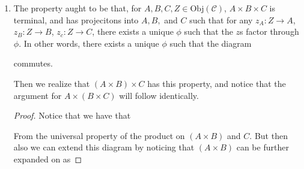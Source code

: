 \documentclass[12pt, twosided]{article}
\begin{document}
\begin{enumerate}
\begin{proof}
    In order to see this, recall that there must exist identity morphisms on \(F\) and \(G\), so then the diagram

    \begin{center}
    \end{center}
    must commute with \(g \circ f = \mathrm{id}_F\) and \(f \circ g = \mathrm{id}_G\), so \(f\) and \(g\) are inverses, and so \(F\) and \(G\) are isomorphic.
  \end{proof}
\item The property aught to be that, for \(A, B, C, Z\in \mathrm{Obj}(\mathcal{C})\), \(A \times B \times C\) is terminal, and has projecitons into \(A, B,\) and \(C\) such that for any \(z_A: Z \to A\), \(z_B: Z \to B\), \(z_c: Z \to C\), there exists a unique \(\phi\) such that the \(z\)s factor through \(\phi\). In other words, there exists a unique \(\phi\) such that the diagram
  \begin{center}
  \end{center}
  commutes.

  Then we realize that \((A \times B) \times C\) has this property, and notice that the argument for \(A \times (B \times C)\) will follow identically.

  \begin{proof}
    Notice that we have that
    \begin{center}
    \end{center}
    From the universal property of the product on \((A \times B)\) and \(C\). But then also we can extend this diagram by noticing that \((A \times B)\) can be further expanded on as


\end{proof}
\end{enumerate}
\end{document}
